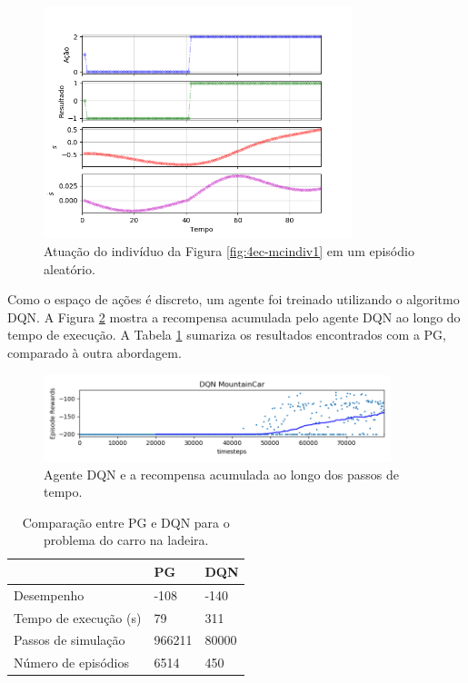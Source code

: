 \begin{figure}[H]
	\centering
	\includegraphics[width=0.8\textwidth]{02_desenvolvimento/04_EC_Fig_MCVarAval}
	\caption{Atuação do indivíduo da Figura \ref{fig:4ec-mcindiv1} em um episódio aleatório.}
	\label{fig:4ec-mcvaraval}
\end{figure}

Como o espaço de ações é discreto, um agente foi treinado utilizando o algoritmo DQN. A Figura \ref{fig:4ec-mcdqntrain} mostra a recompensa acumulada pelo agente DQN ao longo do tempo de execução. A Tabela \ref{tab:4ec-mccomp} sumariza os resultados encontrados com a PG, comparado à outra abordagem.

\begin{figure}[H]
	\centering
	\includegraphics[width=0.9\textwidth]{02_desenvolvimento/04_EC_Fig_MCDQNTrain.png}
	\caption{Agente DQN e a recompensa acumulada ao longo dos passos de tempo.}
	\label{fig:4ec-mcdqntrain}
\end{figure}

\begin{table}[H]
	\centering
	\begin{tabular}{l|l|l} \toprule
		{} & {{PG}} & {{DQN}} \\ \midrule
		{{Desempenho}} & {-108} & {-140} \\
		{{Tempo de execução (s)}} & {79} & {311} \\
		{{Passos de simulação}} & {966211} & {80000} \\
		{{Número de episódios}} & {6514} & {450\footnotemark} \\
		\bottomrule
	\end{tabular}
	\caption{Comparação entre PG e DQN para o problema do carro na ladeira.}\label{tab:4ec-mccomp}
\end{table}

